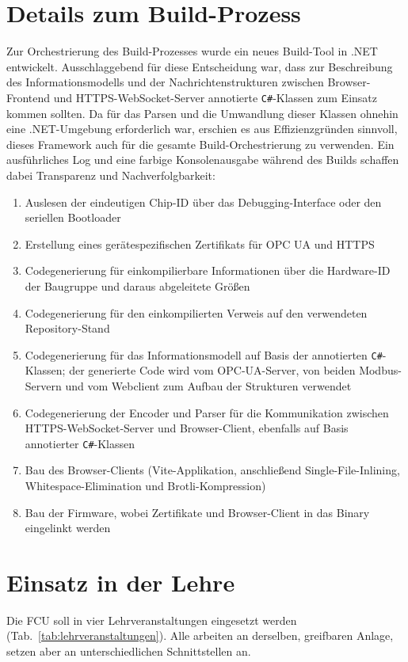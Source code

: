 \documentclass[]{article}%
\begin{document}
\section{Details zum Build-Prozess}
Zur Orchestrierung des Build-Prozesses wurde ein neues Build-Tool in .NET entwickelt. Ausschlaggebend für diese Entscheidung war, dass zur Beschreibung des Informationsmodells und der Nachrichtenstrukturen zwischen Browser-Frontend und HTTPS-WebSocket-Server annotierte \texttt{C\#}-Klassen zum Einsatz kommen sollten. Da für das Parsen und die Umwandlung dieser Klassen ohnehin eine .NET-Umgebung erforderlich war, erschien es aus Effizienzgründen sinnvoll, dieses Framework auch für die gesamte Build-Orchestrierung zu verwenden. Ein ausführliches Log und eine farbige Konsolenausgabe während des Builds schaffen dabei Transparenz und Nachverfolgbarkeit:
\begin{enumerate}
\item Auslesen der eindeutigen Chip-ID über das Debugging-Interface oder den seriellen Bootloader
\item Erstellung eines gerätespezifischen Zertifikats für OPC UA und HTTPS
\item Codegenerierung für einkompilierbare Informationen über die Hardware-ID der Baugruppe und daraus abgeleitete Größen
\item Codegenerierung für den einkompilierten Verweis auf den verwendeten Repository-Stand
\item Codegenerierung für das Informationsmodell auf Basis der annotierten \texttt{C\#}-Klassen; der generierte Code wird vom OPC-UA-Server, von beiden Modbus-Servern und vom Webclient zum Aufbau der Strukturen verwendet
\item Codegenerierung der Encoder und Parser für die Kommunikation zwischen HTTPS-WebSocket-Server und Browser-Client, ebenfalls auf Basis annotierter \texttt{C\#}-Klassen
\item Bau des Browser-Clients (Vite-Applikation, anschließend Single-File-Inlining, Whitespace-Elimination und Brotli-Kompression)
\item Bau der Firmware, wobei Zertifikate und Browser-Client in das Binary eingelinkt werden
\end{enumerate}


\section{Einsatz in der Lehre}

Die FCU soll in vier Lehrveranstaltungen eingesetzt werden (Tab.~\ref{tab:lehrveranstaltungen}). Alle arbeiten an derselben, greifbaren Anlage, setzen aber an unterschiedlichen Schnittstellen an.
\end{document}
